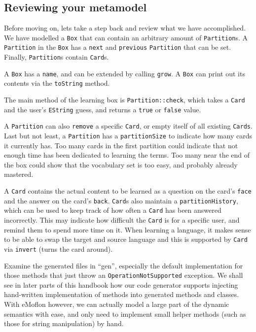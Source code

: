 \newpage 
\genHeader
\subsection{Reviewing your metamodel}
\hypertarget{static review}{}

Before moving on, lets take a step back and review what we have accomplished. We have modelled a \texttt{Box} that can contain an arbitrary amount of
\texttt{Partition}s. A \texttt{Partition} in the \texttt{Box} has a \texttt{next} and \texttt{previous} \texttt{Partition} that can be set. Finally,
\texttt{Partition}s contain \texttt{Card}s.

A \texttt{Box} has a \texttt{name}, and can be extended by calling \texttt{grow}. A \texttt{Box} can print out its contents via the \texttt{toString} method.

The main method of the learning box is \texttt{Partition::check}, which takes a \texttt{Card} and the user's \texttt{EString} guess, and returns a \texttt{true}
or \texttt{false} value.

A \texttt{Partition} can also \texttt{remove} a specific \texttt{Card}, or empty itself of all  existing \texttt{Cards}. Last but not least, a
\texttt{Partition} has a \texttt{partitionSize} to indicate how many cards it currently has. Too many cards in the first partition could indicate that not
enough time has been dedicated to learning the terms. Too many near the end of the box could show that the vocabulary set is too easy, and probably
already mastered.

A \texttt{Card} contains the actual content to be learned as a question on the card's \texttt{face} and the answer on the card's \texttt{back}. \texttt{Card}s
also maintain a \texttt{partition\-History}, which can be used to keep track of how often a \texttt{Card} has been answered incorrectly.
This may indicate how difficult the \texttt{Card} is for a specific user, and remind them to spend more time on it. When learning a language, it makes
sense to be able to swap the target and source language and this is supported by \texttt{Card} via \texttt{invert} (turns the card around).

Examine the generated files in ``gen'', especially the default implementation for those methods that just throw an \texttt{OperationNotSupported} exception. We
shall see in later parts of this handbook how our code generator supports injecting hand-written implementation of methods into generated methods and classes.
With eMoflon however, we can actually model a large part of the dynamic semantics with ease, and only need to implement small helper methods (such as those for
string manipulation) by hand.


